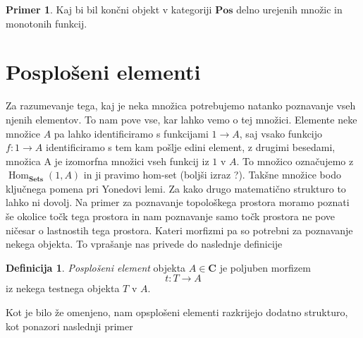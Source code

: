 \documentclass[12pt,a4paper]{book}
\theoremstyle{definition}
\newtheorem{definicija}{Definicija}[chapter]
\theoremstyle{plain}
\theoremstyle{definition}
\newtheorem{primer}{Primer}[section]
\theoremstyle{remark}
\newcommand{\cat}[1]{\textbf{#1}}
\DeclareMathOperator{\Hom}{Hom}
\begin{document}

\begin{primer}
Kaj bi bil končni objekt v kategoriji $\cat{Pos}$ delno urejenih množic in monotonih funkcij. 
\end{primer}

\section{Posplošeni elementi}
Za razumevanje tega, kaj je neka množica potrebujemo natanko poznavanje vseh njenih elementov. To nam pove vse, kar lahko vemo o tej množici. Elemente neke množice $A$ pa lahko identificiramo s funkcijami $1 \to A$, saj vsako funkcijo $f : 1 \to A$ identificiramo s tem kam pošlje edini element, z drugimi besedami, množica A je izomorfna množici vseh funkcij iz $1$ v $A$. To množico označujemo z $\Hom_{\cat{Sets}} (1,A)$ in ji pravimo hom-set (boljši izraz ?). Takšne množice bodo ključnega pomena pri Yonedovi lemi.
Za kako drugo matematično strukturo to lahko ni dovolj. Na primer za poznavanje topološkega prostora moramo poznati še okolice točk tega prostora in nam poznavanje samo točk prostora ne pove ničesar o lastnostih tega prostora. Kateri morfizmi pa so potrebni za poznavanje nekega objekta. To vprašanje nas privede do naslednje definicije

\begin{definicija}
\textit{Posplošeni element} objekta $A \in \cat{C}$ je poljuben morfizem 
$$t : T \to A$$
iz nekega testnega objekta $T$ v $A$.
\end{definicija}
Kot je bilo že omenjeno, nam opsplošeni elementi razkrijejo dodatno strukturo, kot ponazori naslednji primer
\end{document}
